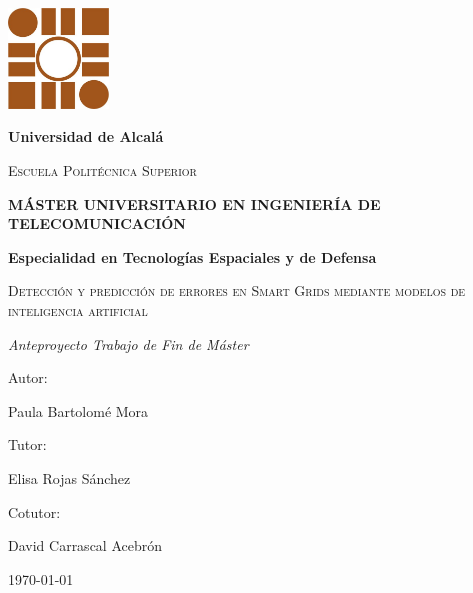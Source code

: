 \begin{titlepage}
\centering
{\includegraphics[width=0.2\textwidth]{./img/logo}\par}
\vspace{0.5cm}
{\bfseries\LARGE Universidad de Alcalá  \par}
\vspace{0.4cm}
{\scshape\Large Escuela Politécnica Superior \par}
\vspace{1.2cm}
{\bfseries\Large MÁSTER UNIVERSITARIO EN INGENIERÍA DE  TELECOMUNICACIÓN  \par}
\vspace{0.3cm}
{\bfseries\Large Especialidad en Tecnologías Espaciales y de Defensa  \par}
\vspace{2.1cm}
{\scshape\Huge Detección y predicción de errores en Smart Grids mediante modelos de inteligencia artificial\par}
\vspace{1.5cm}
{\itshape\Large Anteproyecto Trabajo de Fin de Máster \par}
\vfill
{\Large Autor: \par}
{\Large Paula Bartolomé Mora \par}
\vfill
{\Large Tutor: \par}
{\Large Elisa Rojas Sánchez \par}
\vfill
{\Large Cotutor: \par}
{\Large David Carrascal Acebrón \par}
\vfill
{\Large \today \par}
\end{titlepage}
